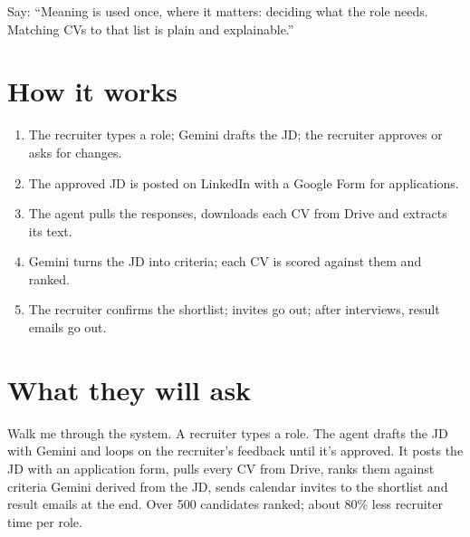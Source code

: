 \begin{sayit}
\begin{pic}
\end{pic}
Say: ``Meaning is used once, where it matters: deciding what the role needs. Matching CVs to that list is plain and explainable.''
\end{sayit}

\section{How it works}
\begin{enumerate}
  \item The recruiter types a role; Gemini drafts the JD; the recruiter approves or asks for changes.
  \item The approved JD is posted on LinkedIn with a Google Form for applications.
  \item The agent pulls the responses, downloads each CV from Drive and extracts its text.
  \item Gemini turns the JD into criteria; each CV is scored against them and ranked.
  \item The recruiter confirms the shortlist; invites go out; after interviews, result emails go out.
\end{enumerate}

\section{What they will ask}

\begin{iq}[\core]{Walk me through the system.}
A recruiter types a role. The agent drafts the JD with Gemini and loops on the recruiter's feedback until it's approved. It posts the JD with an application form, pulls every CV from Drive, ranks them against criteria Gemini derived from the JD, sends calendar invites to the shortlist and result emails at the end. Over 500 candidates ranked; about 80\% less recruiter time per role.
\end{iq}

